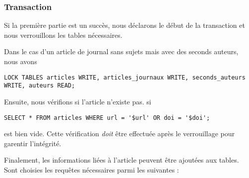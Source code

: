 \documentclass[a4paper, 12pt]{article}
\begin{document}
    \subsubsection{Transaction}
    Si la première partie est un succès, nous déclarons le début de la transaction et nous verrouillons les tables nécessaires.
    
    Dans le cas d'un article de journal sans sujets mais avec des seconds auteurs, nous avons
    \begin{lstlisting}[style=sql, gobble=8]
        LOCK TABLES articles WRITE, articles_journaux WRITE, seconds_auteurs WRITE, auteurs READ;
    \end{lstlisting}
    Ensuite, nous vérifions si l'article n'existe pas. \Cad{} si
    \begin{lstlisting}[style=sql, gobble=8]
        SELECT * FROM articles WHERE url = '$url' OR doi = '$doi';
    \end{lstlisting}
    est bien vide. Cette vérification \emph{doit} être effectuée après le verrouillage pour garentir l'intégrité. \par
    Finalement, les informations liées à l'article peuvent être ajoutées aux tables. Sont choisies les requêtes nécessaires parmi les suivantes :
\end{document}
